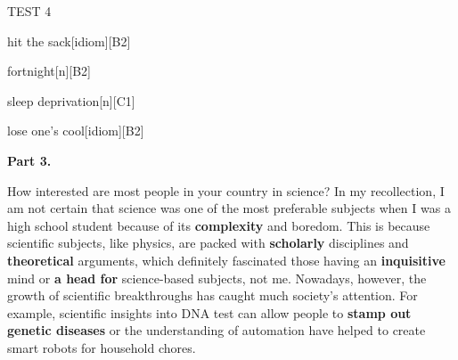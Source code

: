 \begin{glossarymc}[Cambridge 15]
\begin{test}{TEST 4}
\begin{VocabExplain}[Part 2]
            \begin{ExplainCard}{hit the sack}[idiom][B2]
            \end{ExplainCard}

            \begin{ExplainCard}{fortnight}[n][B2]
            \end{ExplainCard}

            \begin{ExplainCard}{sleep deprivation}[n][C1]
            \end{ExplainCard}

            \begin{ExplainCard}{lose one’s cool}[idiom][B2]
            \end{ExplainCard}
        \end{VocabExplain}

    \noindent
    \textbf{Part 3.}
    \begin{qa}{How interested are most people in your country in science?}
    In my recollection, I am not certain that science was one of the most preferable subjects when I was a high school student because of its \textbf{complexity} and boredom. This is because scientific subjects, like physics, are packed with \textbf{scholarly} disciplines and \textbf{theoretical} arguments, which definitely fascinated those having an \textbf{inquisitive} mind or \textbf{a head for} science-based subjects, not me. Nowadays, however, the growth of scientific breakthroughs has caught much society’s attention. For example, scientific insights into DNA test can allow people to \textbf{stamp out genetic diseases} or the understanding of automation have helped to create smart robots for household chores.
    \end{qa}


\end{test}
\end{glossarymc}
